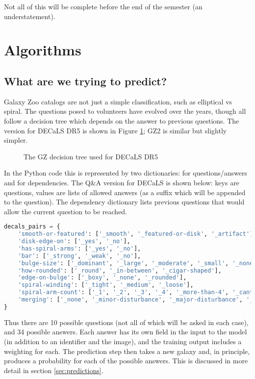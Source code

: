 \documentclass[preprint]{aastex631}
\begin{document}
Not all of this will be complete before the end of the semester (an understatement).

\section{Algorithms} \label{algorithms}

\subsection{What are we trying to predict?}

Galaxy Zoo catalogs are not just a simple classification, such as elliptical vs spiral. The questions posed to volunteers have evolved over the years, though all follow a decision tree which depends on the answer to previous questions. The version for DECaLS DR5 is shown in Figure \ref{fig:decals_decisions}; GZ2 is similar but slightly simpler.

\begin{figure}[htb!]
	\caption{The GZ decision tree used for DECaLS DR5
		\label{fig:decals_decisions}}
\end{figure}

In the Python code this is represented by two dictionaries: for questions/answers and for dependencies. The Q\&A version for DECaLS is shown below: keys are questions, values are lists of allowed answers (as a suffix which will be appended to the question). The dependency dictionary lists previous questions that would allow the current question to be reached.


\begin{lstlisting}[language=Python]
decals_pairs = {
	'smooth-or-featured': ['_smooth', '_featured-or-disk', '_artifact'],
	'disk-edge-on': ['_yes', '_no'],
	'has-spiral-arms': ['_yes', '_no'],
	'bar': ['_strong', '_weak', '_no'],
	'bulge-size': ['_dominant', '_large', '_moderate', '_small', '_none'],
	'how-rounded': ['_round', '_in-between', '_cigar-shaped'],
	'edge-on-bulge': ['_boxy', '_none', '_rounded'],
	'spiral-winding': ['_tight', '_medium', '_loose'],
	'spiral-arm-count': ['_1', '_2', '_3', '_4', '_more-than-4', '_cant-tell'],
	'merging': ['_none', '_minor-disturbance', '_major-disturbance', '_merger']
}
\end{lstlisting}

Thus there are 10 possible questions (not all of which will be asked in each case), and 34 possible answers. Each answer has its own field in the input to the model (in addition to an identifier and the image), and the training output includes a weighting for each. The prediction step then takes a new galaxy and, in principle, produces a probability for each of the possible answers. This is discussed in more detail in section \ref{sec:predictions}.
\end{document}

